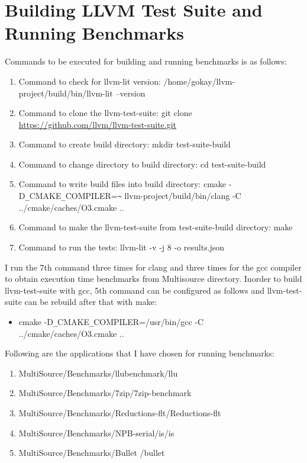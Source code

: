 \documentclass[16pt]{article}
\begin{document}
\section*{Building LLVM Test Suite and Running Benchmarks}
   \vspace{5pt}
   \noindent Commands to be executed for building\cite{Getting-Started-with-the-LLVM-System}\cite{What-is-LLVM}\cite{Installing-LLVM} and running benchmarks is as follows:
    \begin{enumerate}
        \item Command to check for llvm-lit version: /home/gokay/llvm-project/build/bin/llvm-lit --version
        \item Command to clone the llvm-test-suite: git clone \url{https://github.com/llvm/llvm-test-suite.git}
        \item Command to create build directory: mkdir test-suite-build
        \item Command to change directory to build directory: cd test-suite-build
        \item Command to write build files into build directory: cmake -D\verb|_|CMAKE\verb|_|COMPILER=\verb|~| llvm-project/build/bin/clang -C ../cmake/caches/O3.cmake ..
        \item Command to make the llvm-test-suite from test-suite-build directory: make
        \item Command to run the tests: llvm-lit -v -j 8 -o results.json
    \end{enumerate}
    

    \noindent
    I run the 7th command three times for clang and three times for the gcc compiler to obtain execution time benchmarks from Multisource directory. Inorder to build llvm-test-suite with gcc, 5th command can be configured as follows and llvm-test-suite can be rebuild after that with make\cite{test-suite}:
    \begin{itemize}
        \item cmake -D\verb|_|CMAKE\verb|_|COMPILER=/usr/bin/gcc -C ../cmake/caches/O3.cmake ..
    \end{itemize}
    \vspace{5pt}
    Following are the applications that I have chosen for running benchmarks:
    \begin{enumerate}
        \item MultiSource/Benchmarks/llubenchmark/llu
        \item MultiSource/Benchmarks/7zip/7zip-benchmark
        \item MultiSource/Benchmarks/Reductions-flt/Reductions-flt
        \item MultiSource/Benchmarks/NPB-serial/is/is
        \item MultiSource/Benchmarks/Bullet /bullet
    \end{enumerate}
\end{document}
